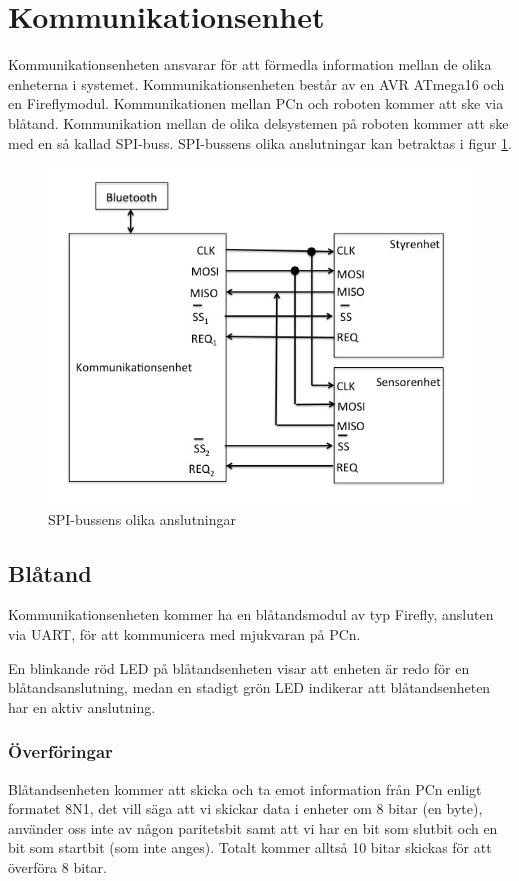 \section{Kommunikationsenhet}
Kommunikationsenheten ansvarar för att förmedla information mellan de olika enheterna i systemet. Kommunikationsenheten består av en AVR ATmega16 och en Fireflymodul. 
Kommunikationen mellan PCn och roboten kommer att ske via blåtand. Kommunikation mellan de olika delsystemen på roboten kommer att ske med en så kallad SPI-buss. SPI-bussens olika anslutningar kan betraktas i figur \ref{fig:spibuss}.

\begin{figure}[H]
  \centering
 \includegraphics[angle=0,scale=0.5]{bilder/SPI-buss.png}
  \caption{SPI-bussens olika anslutningar}
  \label{fig:spibuss}
\end{figure}


\subsection{Blåtand}
Kommunikationsenheten kommer ha en blåtandsmodul av typ Firefly, ansluten via
UART, för att kommunicera med mjukvaran på PCn.

En blinkande röd LED på blåtandsenheten visar att enheten är redo för en
blåtandsanslutning, medan en stadigt grön LED indikerar att blåtandsenheten har
en aktiv anslutning.

\subsubsection{Överföringar}
Blåtandsenheten kommer att skicka och ta emot information från PCn enligt formatet
8N1, det vill säga att vi skickar data i enheter om 8 bitar (en byte), använder oss
inte av någon paritetsbit samt att vi har en bit som slutbit och en bit som startbit
(som inte anges). Totalt kommer alltså 10 bitar skickas för att överföra 8
bitar. 

